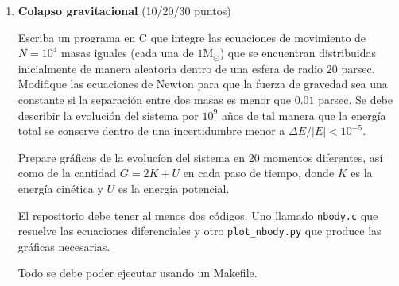 \documentclass{article}
\begin{document}
\begin{enumerate}
\begin{enumerate}
  Ahora evolucione estas nuevas condiciones iniciales por un intervalo
  $T=5$  para ver la interacci\'on de las dos galaxias.  Prepare
  gr\'aficas de la posicion de las part\'iculas de las dos galaxias en
  $M=5$ momentos diferentes equiespaciados en el tiempo $T$.

  Note que en esta configuraci\'on las masas centrales sienten su
  influencia mutua y su \'orbita tambi\'en debe ser calculada.

\end{enumerate}

El repositorio debe tener al menos tres c\'odigos con los siguientes nombres:

\begin{enumerate}
\item \verb"IC.c": c\'odigo que genera las condiciones iniciales de
  una sola galaxia con las posiciones y velocidades del centro de masa
  dadas como par\'ametros de entrada al momento de ejecutar el programa.
\item \verb"evolve.c": c\'odigo que evoluciona un archivo con 
  condiciones iniciales dadas al momento de ejecutar el programa.
\item \verb"plots.py": c\'odigo que prepara gr\'aficas de
  posiciones, tomando como entrada un n\'umero
  arbitrario de archivos de ID, posiciones y velocidades.
\end{enumerate}

Todos los pasos deben poder ejecutarse con un Makefile.
Inspiraci\'on: \verb"http://viz.adrian.pw/galaxy/"

\item {\bf Colapso gravitacional} (10/20/30 puntos)

Escriba un programa en C que integre las ecuaciones de movimiento de
$N=10^4$ masas iguales (cada una de $1$M$_\odot$) que se encuentran
distribuidas inicialmente de manera aleatoria dentro de una esfera de
radio $20$ parsec. Modifique las ecuaciones de Newton para que la
fuerza de gravedad sea una constante si la separaci\'on entre dos
masas es menor que $0.01$ parsec. Se debe describir la evoluci\'on del
sistema por $10^9$ a\~nos de tal manera que la energ\'ia total se
conserve dentro de una incertidumbre menor a $\Delta E/|E|<10^{-5}$.  

Prepare gr\'aficas de la evoluc\'ion del sistema en 20 momentos
diferentes, as\'i como de la cantidad $G=2K+U$ en cada paso de tiempo,
donde $K$ es la energ\'ia cin\'etica y $U$ es la energ\'ia potencial.  
 
El repositorio debe tener al menos dos c\'odigos. Uno llamado
\verb"nbody.c" que resuelve las ecuaciones diferenciales y otro
\verb"plot_nbody.py" que produce las gr\'aficas necesarias.

Todo se debe poder ejecutar usando un Makefile.

\end{enumerate}
\end{document}
